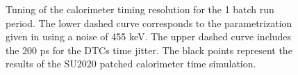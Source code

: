 \begin{figure}[h]
  \caption{
    \label{fig:calorimeter_timing_resolution_1batch}
    Tuning of the calorimeter timing resolution for the 1 batch run period.
    The lower dashed curve corresponds to the parametrization given in 
    \cite{MU2E_36225_CALO_TIME_RES} using a noise of 455 keV.
    The upper dashed curve includes the 200 ps for the DTCs time jitter.
    The black points represent the results of the SU2020 patched calorimeter time simulation.
  }
\end{figure}

